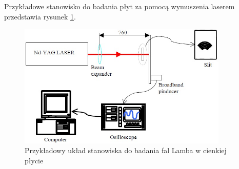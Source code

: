 Przykładowe stanowisko do badania płyt za pomocą wymuszenia laserem przedstawia rysunek \ref{fig:laser}.

\begin{figure}[h]
\centering
\includegraphics[width=10cm]{Zdjecia/2/laser}
\caption{Przykładowy układ stanowiska do badania fal Lamba w cienkiej płycie \cite{bartek_tian}}
\label{fig:laser}
\end{figure}